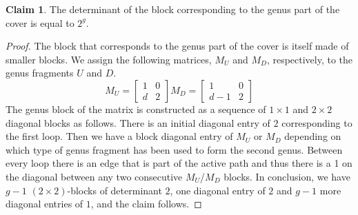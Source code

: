 \documentclass[11pt,reqno]{amsart}
\theoremstyle{definition}
\newtheorem{claim}[theorem]{Claim}
\begin{document}
\begin{claim}
    The determinant of the block corresponding to the genus part of the cover is equal to $2^g$. 
\end{claim}

\begin{proof}
    
The block that corresponds to the genus part of the cover is itself made of smaller blocks.    We assign  the following matrices, $M_U$ and $M_D$, respectively, to the genus fragments $U$ and $D$. %
\[ M_U=\left[ \begin{array}{cc}
1 & 0 \\
d & 2
\end{array} \right]
%
M_D=\left[ \begin{array}{cc}
1 & 0 \\
d-1 & 2
\end{array} \right]
\]
The genus block of the matrix
is constructed as a sequence of $1\times 1$ and $2\times 2$ diagonal blocks as follows. 
There is an initial diagonal entry of $2$ corresponding to the first loop.
Then we have a block diagonal %
entry of $M_U$ or $M_D$ depending on which type of genus fragment has been used to form the second genus. Between every loop there is an edge that is part of the active path and thus there is a 1 on the diagonal between any two consecutive $M_U$/$M_D$ blocks.
In conclusion, we have $g-1$ $(2\times 2)$-blocks of determinant $2$, one diagonal entry of $2$ and $g-1$ more diagonal entries of $1$, and the claim follows.
\end{proof}
\end{document}
